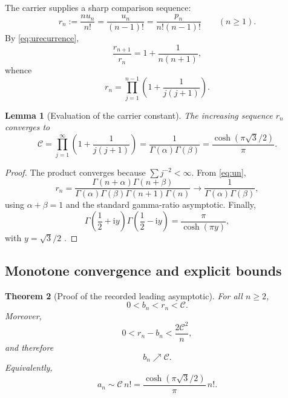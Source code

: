 \documentclass[11pt,a4paper]{article}
\newtheorem{theorem}{Theorem}[section]
\newtheorem{lemma}[theorem]{Lemma}
\theoremstyle{definition}
\theoremstyle{remark}
\newcommand{\ii}{\mathrm{i}}
\newcommand{\constC}{\mathcal{C}}
\begin{document}
The carrier supplies a sharp comparison sequence:
\begin{equation}\label{eq:rn}
 r_n:=\frac{n u_n}{n!}=\frac{u_n}{(n-1)!}
 =\frac{p_n}{n!(n-1)!}
 \qquad(n\ge1).
\end{equation}
By \eqref{eq:urecurrence},
\begin{equation}\label{eq:rnratio}
 \frac{r_{n+1}}{r_n}=1+\frac{1}{n(n+1)},
\end{equation}
whence
\begin{equation}\label{eq:rnproduct}
 r_n=\prod_{j=1}^{n-1}\left(1+\frac{1}{j(j+1)}\right).
\end{equation}

\begin{lemma}[Evaluation of the carrier constant]\label{lem:C}
The increasing sequence \(r_n\) converges to
\begin{equation}\label{eq:Cproduct}
 \constC=\prod_{j=1}^{\infty}\left(1+\frac{1}{j(j+1)}\right)
 =\frac{1}{\Gamma(\alpha)\Gamma(\beta)}
 =\frac{\cosh(\pi\sqrt3/2)}{\pi}.
\end{equation}
\end{lemma}

\begin{proof}
The product converges because \(\sum j^{-2}<\infty\).  From \eqref{eq:un},
\[
 r_n=\frac{\Gamma(n+\alpha)\Gamma(n+\beta)}
 {\Gamma(\alpha)\Gamma(\beta)\Gamma(n+1)\Gamma(n)}
 \longrightarrow\frac{1}{\Gamma(\alpha)\Gamma(\beta)},
\]
using \(\alpha+\beta=1\) and the standard gamma-ratio asymptotic.  Finally,
\[
 \Gamma\!\left(\frac12+\ii y\right)
 \Gamma\!\left(\frac12-\ii y\right)
 =\frac{\pi}{\cosh(\pi y)},
\]
with \(y=\sqrt3/2\) \cite{DLMFGamma}.
\end{proof}

\subsection{Monotone convergence and explicit bounds}

\begin{theorem}[Proof of the recorded leading asymptotic]\label{thm:leading}
For all \(n\ge2\),
\begin{equation}\label{eq:globalupper}
 0<b_n<r_n<\constC.
\end{equation}
Moreover,
\begin{equation}\label{eq:gapbound}
 0<r_n-b_n<\frac{2\constC^2}{n},
\end{equation}
and therefore
\begin{equation}\label{eq:bnlimit}
 b_n\nearrow\constC.
\end{equation}
Equivalently,
\[
 a_n\sim\constC\,n!
 =\frac{\cosh(\pi\sqrt3/2)}{\pi}\,n!.
\]
\end{theorem}
\end{document}
